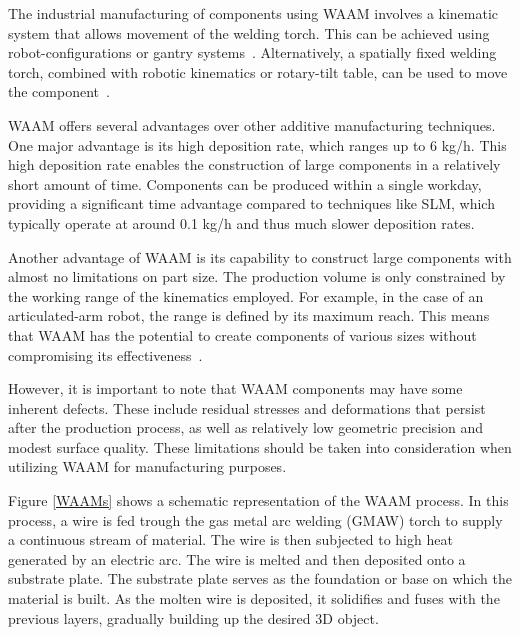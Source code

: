 The industrial manufacturing of components using \acrshort{WAAM} involves a kinematic system that allows movement of the welding torch. This can be achieved using robot-configurations or gantry systems~\cite{Schmitz.2021}. Alternatively, a spatially fixed welding torch, combined with robotic kinematics or rotary-tilt table, can be used to move the component~\cite{Nagasai.2022}. %


\acrshort{WAAM} offers several advantages over other additive manufacturing techniques. One major advantage is its high deposition rate, which ranges up to 6 kg/h. This high deposition rate enables the construction of large components in a relatively short amount of time. Components can be produced within a single workday, providing a significant time advantage compared to techniques like SLM, which typically operate at around 0.1 kg/h and thus much slower deposition rates. \cite{IvanTabernero.2018} 

Another advantage of \acrshort{WAAM} is its capability to construct large components with almost no limitations on part size. The production volume is only constrained by the working range of the kinematics employed. For example, in the case of an articulated-arm robot, the range is defined by its maximum reach. This means that \acrshort{WAAM} has the potential to create components of various sizes without compromising its effectiveness~\cite{Li.2019}.

However, it is important to note that \acrshort{WAAM} components may have some inherent defects. These include residual stresses and deformations that persist after the production process, as well as relatively low geometric precision and modest surface quality. These limitations should be taken into consideration when utilizing \acrshort{WAAM} for manufacturing purposes. \cite{Wu.2018}

Figure \ref{WAAMs} shows a schematic representation of the \acrshort{WAAM} process. In this process, a wire is fed trough the gas metal arc welding (\acrshort{GMAW}) torch to supply a continuous stream of material. The wire is then subjected to high heat generated by an electric arc. The wire is melted and then deposited onto a substrate plate. The substrate plate serves as the foundation or base on which the material is built. As the molten wire is deposited, it solidifies and fuses with the previous layers, gradually building up the desired 3D object.

